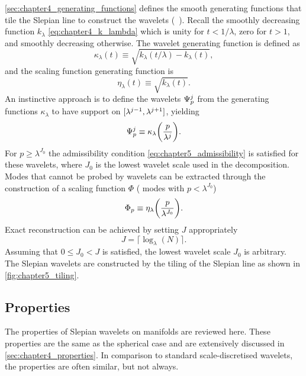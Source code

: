\cref{sec:chapter4_generating_functions} defines the smooth generating functions that tile the Slepian line to construct the wavelets (\cf{}~\cite{Wiaux2008}).
Recall the smoothly decreasing function \(k_{\lambda}\) \cref{eq:chapter4_k_lambda} which is unity for \(t < 1/\lambda{}\), zero for \(t > 1\), and smoothly decreasing otherwise.
The wavelet generating function is defined as
%
\begin{equation}
	\kappa_{\lambda}(t)
	\equiv \sqrt{k_{\lambda}(t/\lambda) - k_{\lambda}(t)},
\end{equation}
%
and the scaling function generating function is
%
\begin{equation}
	\eta_{\lambda}(t)
	\equiv \sqrt{k_{\lambda}(t)}.
\end{equation}
%
An instinctive approach is to define the wavelets \({\Psi}_{p}^{j}\) from the generating functions \(\kappa_{\lambda}\) to have support on \(\interval{\lambda^{j-1}}{\lambda^{j+1}}\), yielding
%
\begin{equation}
	{\Psi}_{p}^{j}
	\equiv \kappa_{\lambda}\bigg(\frac{p}{\lambda^{j}}\bigg).
\end{equation}
%
For \(p \geq \lambda^{J_{0}}\) the admissibility condition \cref{eq:chapter5_admissibility} is satisfied for these wavelets, where \(J_{0}\) is the lowest wavelet scale used in the decomposition.
Modes that cannot be probed by wavelets can be extracted through the construction of a scaling function \(\Phi{}\) (\ie{} modes with \(p < \lambda^{J_{0}}\))
%
\begin{equation}
	{\Phi}_{p}
	\equiv \eta_{\lambda}\bigg(\frac{p}{\lambda^{J_{0}}}\bigg).
\end{equation}
%
Exact reconstruction can be achieved by setting \(J\) appropriately
%
\begin{equation}
	J = \lceil{} \log_{\lambda}(N)\rceil{}.
\end{equation}
%
Assuming that \(0 \leq J_{0} < J\) is satisfied, the lowest wavelet scale \(J_{0}\) is arbitrary.
The Slepian wavelets are constructed by the tiling of the Slepian line as shown in \cref{fig:chapter5_tiling}.



\subsection{Properties}\label{sec:chapter5_properties}

The properties of Slepian wavelets on manifolds are reviewed here.
These properties are the same as the spherical case and are extensively discussed in \cref{sec:chapter4_properties}.
In comparison to standard scale-discretised wavelets, the properties are often similar, but not always.

